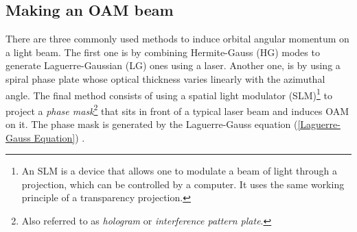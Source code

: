 \subsection{Making an OAM beam}
\label{c2:Making an OAM beam}

There are three commonly used methods to induce orbital angular momentum on a light beam. The first one is by combining Hermite-Gauss (HG) modes to generate Laguerre-Gaussian (LG) ones using a laser. Another one, is by using a spiral phase plate whose optical thickness varies linearly with the azimuthal angle. The final method consists of using a spatial light modulator (SLM)\footnote{An SLM is a device that allows one to modulate a beam of light through a projection, which can be controlled by a computer. It uses the same working principle of a transparency projection.} to project a \textit{phase mask}\footnote{Also referred to as \textit{hologram} or \textit{interference pattern plate}.} that sits in front of a typical laser beam and induces OAM on it. The phase mask is generated by the Laguerre-Gauss equation (\ref{Laguerre-Gauss Equation}) \cite{Anguita:08}.

